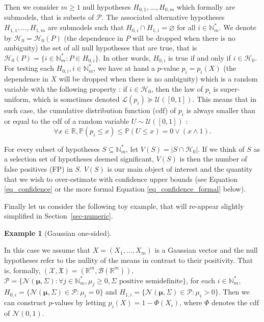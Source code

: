 \documentclass[
  11pt,
  a4paper,
]{article}
\theoremstyle{definition}
\newtheorem{example}{Example}[section]
\theoremstyle{plain}
\theoremstyle{plain}
\theoremstyle{plain}
\theoremstyle{definition}
\theoremstyle{remark}
\begin{document}
Then we consider \(m\geq1\) null hypotheses \(H_{0,1}, \dotsc, H_{0,m}\)
which formally are submodels, that is subsets of \(\mathcal{P}\). The
associated alternative hypotheses \(H_{1,1}, \dotsc, H_{1,m}\) are
submodels such that \(H_{0,i}\cap H_{1,i}=\varnothing\) for all
\(i\in\mathbb{N}_m^*\). We denote by \(\mathcal{H}_0=\mathcal{H}_0(P)\)
(the dependence in \(P\) will be dropped when there is no ambiguity) the
set of all null hypotheses that are true, that is
\(\mathcal{H}_0(P)=\{i\in\mathbb{N}_m^* : P\in H_{0,i}\}\). In other
words, \(H_{0,i}\) is true if and only if \(i\in\mathcal{H}_0\). For
testing each \(H_{0,i}, i\in\mathbb{N}_m^*\), we have at hand a
\(p\)-value \(p_i=p_i(X)\) (the dependence in \(X\) will be dropped when
there is no ambiguity) which is a random variable with the following
property : if \(i\in\mathcal{H}_0\), then the law of \(p_i\) is
super-uniform, which is sometimes denoted
\(\mathcal L(p_i)\succeq \mathcal{U}([0,1])\). This means that in such
case, the cumulative distribution function (cdf) of \(p_i\) is always
smaller than or equal to the cdf of a random variable
\(U\sim \mathcal{U}([0,1])\) : \begin{equation}
\forall x \in \mathbb{R}, \mathbb{P}\left(p_i\leq x\right)\leq \mathbb{P}\left(U\leq x\right) = 0\vee(x\wedge 1).
\label{eq_super_unif}
\end{equation}

For every subset of hypotheses \(S\subseteq\mathbb{N}_m^*\), let
\(V(S)=|S\cap\mathcal{H}_0|\). If we think of \(S\) as a selection set
of hypotheses deemed significant, \(V(S)\) is then the number of false
positives (FP) in \(S\). \(V(S)\) is our main object of interest and the
quantity that we wish to over-estimate with confidence upper bounds (see
Equation \eqref{eq_confidence} or the more formal Equation
\eqref{eq_confidence_formal} below).

Finally let us consider the following toy example, that will re-appear
slightly simplified in Section~\ref{sec-numeric}.

\begin{example}[Gaussian
one-sided]\protect\hypertarget{exm-gauss}{}\label{exm-gauss}

In this case we assume that \(X=(X_1,\dotsc,X_m)\) is a Gaussian vector
and the null hypotheses refer to the nullity of the means in contrast to
their positivity. That is, formally,
\((\mathcal{X},\mathfrak{X})=(\mathbb R^m, \mathcal B\left(\mathbb R^m  \right))\),
\(\mathcal P=\{ \mathcal N(\boldsymbol{\mu}, \Sigma) : \forall j \in\mathbb{N}_m^*, \mu_j\geq 0, \Sigma \text{ positive semidefinite}  \}\),
for each \(i\in\mathbb{N}_m^*\),
\(H_{0,i}= \{ \mathcal N(\boldsymbol{\mu}, \Sigma) \in \mathcal P :\mu_i=0 \}\)
and
\(H_{1,i}=\{ \mathcal N(\boldsymbol{\mu}, \Sigma) \in \mathcal P :\mu_i>0 \}\).
Then we can construct \(p\)-values by letting \(p_i(X)=1-\Phi(X_i)\),
where \(\Phi\) denotes the cdf of \(\mathcal N(0,1)\).

\end{example}
\end{document}
